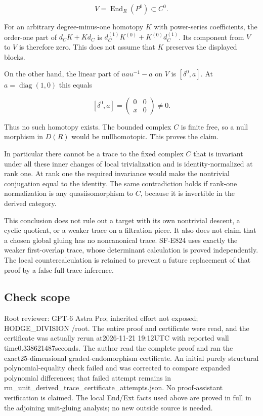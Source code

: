 \[
 V=\operatorname{End}_R(P^0)\subset C^0.
 \tag{DC.2}
\]

For an arbitrary degree-minus-one homotopy \(K\) with power-series
coefficients, the order-one part of \(d_CK+Kd_C\) is
\(d_C^{(1)}K^{(0)}+K^{(0)}d_C^{(1)}\). Its component from \(V\) to \(V\)
is therefore zero. This does not assume that \(K\) preserves the
displayed blocks.

On the other hand, the linear part of \(uau^{-1}-a\) on \(V\) is
\([\delta^0,a]\). At \(a=\operatorname{diag}(1,0)\) this equals

\[
 [\delta^0,a]=\begin{pmatrix}0&0\\x&0\end{pmatrix}\ne0.
 \tag{DC.3}
\]

Thus no such homotopy exists. The bounded complex \(C\) is finite free,
so a null morphism in \(D(R)\) would be nullhomotopic. This proves the
claim.

In particular there cannot be a trace to the fixed complex \(C\) that is
invariant under all these inner changes of local trivialization and is
identity-normalized at rank one. At rank one the required invariance
would make the nontrivial conjugation equal to the identity. The same
contradiction holds if rank-one normalization is any quasiisomorphism to
\(C\), because it is invertible in the derived category.

This conclusion does not rule out a target with its own nontrivial
descent, a cyclic quotient, or a weaker trace on a filtration piece. It
also does not claim that a chosen global gluing has no noncanonical
trace. SF-E824 uses exactly the weaker first-overlap trace, whose
determinant calculation is proved independently. The local
countercalculation is retained to prevent a future replacement of that
proof by a false full-trace inference.

\subsection{Check scope}\label{check-scope}

Root reviewer: GPT-6 Astra Pro; inherited effort not exposed;
HODGE\_DIVISION /root. The entire proof and certificate were read, and
the certificate was actually rerun at2026-11-21 19:12UTC with reported
wall time0.338621487seconds. The author read the complete proof and ran
the exact25-dimensional graded-endomorphism certificate. An initial
purely structural polynomial-equality check failed and was corrected to
compare expanded polynomial differences; that failed attempt remains in
rm\_unit\_derived\_trace\_certificate\_attempts.json. No proof-assistant
verification is claimed. The local End/Ext facts used above are proved
in full in the adjoining unit-gluing analysis; no new outside source is
needed.
